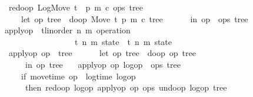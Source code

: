 \documentclass[sigplan,anonymous]{acmart}
\renewcommand{\isacartoucheopen}{}
\renewcommand{\isacartoucheclose}{}
\begin{document}
\begin{figure}
\begin{isabellebody}
\ \ {\isacartoucheopen}redo{\isacharunderscore}op\ {\isacharparenleft}LogMove\ t\ {\isacharunderscore}\ p\ m\ c{\isacharparenright}\ {\isacharparenleft}ops{\isacharcomma}\ tree{\isacharparenright}\ {\isacharequal}\isanewline
\ \ \ \ \ {\isacharparenleft}let\ {\isacharparenleft}op{}{\isacharcomma}\ tree{}{\isacharparenright}\ {\isacharequal}\ do{\isacharunderscore}op\ {\isacharparenleft}Move\ t\ p\ m\ c{\isacharcomma}\ tree{\isacharparenright}\isanewline
\ \ \ \ \ \ in\ {\isacharparenleft}op{}\ {\isacharhash}\ ops{\isacharcomma}\ tree{}{\isacharparenright}{\isacharparenright}{\isacartoucheclose}\isanewline
\isanewline
{}\isamarkupfalse%
\ apply{\isacharunderscore}op\ {\isacharcolon}{\isacharcolon}\ {\isacartoucheopen}{\isacharparenleft}{\isacharprime}t{\isacharcolon}{\isacharcolon}{\isacharbraceleft}linorder{\isacharbraceright}{\isacharcomma}\ {\isacharprime}n{\isacharcomma}\ {\isacharprime}m{\isacharparenright}\ operation\ {\isasymRightarrow}\isanewline
\ \ \ \ \ \ \ \ \ \ \ \ \ \ \ \ \ \ {\isacharparenleft}{\isacharprime}t{\isacharcomma}\ {\isacharprime}n{\isacharcomma}\ {\isacharprime}m{\isacharparenright}\ state\ {\isasymRightarrow}\ {\isacharparenleft}{\isacharprime}t{\isacharcomma}\ {\isacharprime}n{\isacharcomma}\ {\isacharprime}m{\isacharparenright}\ state{\isacartoucheclose}\ \isanewline
\ \ {\isacartoucheopen}apply{\isacharunderscore}op\ op{}\ {\isacharparenleft}{\isacharbrackleft}{\isacharbrackright}{\isacharcomma}\ tree{}{\isacharparenright}\ {\isacharequal}\isanewline
\ \ \ \ \ {\isacharparenleft}let\ {\isacharparenleft}op{}{\isacharcomma}\ tree{}{\isacharparenright}\ {\isacharequal}\ do{\isacharunderscore}op\ {\isacharparenleft}op{}{\isacharcomma}\ tree{}{\isacharparenright}\isanewline
\ \ \ \ \ \ in\ {\isacharparenleft}{\isacharbrackleft}op{}{\isacharbrackright}{\isacharcomma}\ tree{}{\isacharparenright}{\isacharparenright}{\isacartoucheclose}\ {\isacharbar}\isanewline
\ \ {\isacartoucheopen}apply{\isacharunderscore}op\ op{}\ {\isacharparenleft}logop\ {\isacharhash}\ ops{\isacharcomma}\ tree{}{\isacharparenright}\ {\isacharequal}\isanewline
\ \ \ \ \ {\isacharparenleft}if\ move{\isacharunderscore}time\ op{}\ {\isacharless}\ log{\isacharunderscore}time\ logop\isanewline
\ \ \ \ \ \ then\ redo{\isacharunderscore}op\ logop\ {\isacharparenleft}apply{\isacharunderscore}op\ op{}\ {\isacharparenleft}ops{\isacharcomma}\ undo{\isacharunderscore}op\ {\isacharparenleft}logop{\isacharcomma}\ tree{}{\isacharparenright}{\isacharparenright}{\isacharparenright}\isanewline

\end{isabellebody}
\end{figure}
\end{document}
